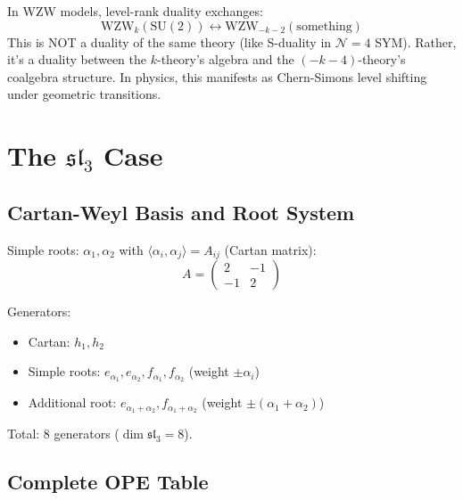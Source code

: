 \begin{remark}
In WZW models, level-rank duality exchanges:
$$\text{WZW}_{k}(\text{SU}(2)) \leftrightarrow \text{WZW}_{-k-2}(\text{something})$$
This is NOT a duality of the same theory (like S-duality in $\mathcal{N}=4$ SYM). Rather, it's a duality between the $k$-theory's algebra and the $(-k-4)$-theory's coalgebra structure. In physics, this manifests as Chern-Simons level shifting under geometric transitions.
\end{remark}

\section{The $\mathfrak{sl}_3$ Case}

\subsection{Cartan-Weyl Basis and Root System}

\begin{definition}
Simple roots: $\alpha_1, \alpha_2$ with $\langle \alpha_i, \alpha_j \rangle = A_{ij}$ (Cartan matrix):
$$A = \begin{pmatrix} 2 & -1 \\ -1 & 2 \end{pmatrix}$$

Generators:
\begin{itemize}
\item Cartan: $h_1, h_2$
\item Simple roots: $e_{\alpha_1}, e_{\alpha_2}, f_{\alpha_1}, f_{\alpha_2}$ (weight $\pm \alpha_i$)
\item Additional root: $e_{\alpha_1+\alpha_2}, f_{\alpha_1+\alpha_2}$ (weight $\pm(\alpha_1+\alpha_2)$)
\end{itemize}
Total: $8$ generators ($\dim \mathfrak{sl}_3 = 8$).
\end{definition}

\subsection{Complete OPE Table}

